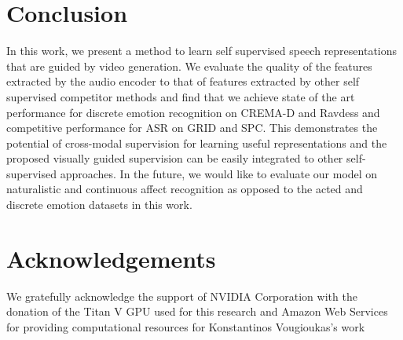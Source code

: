 \documentclass{article}
\begin{document}
\section{Conclusion}
\label{sec:conclusion}
In this work, we present a method to learn self supervised speech representations that are guided by video generation. We evaluate the quality of the features extracted by the audio encoder to that of features extracted by other self supervised competitor methods and find that we achieve state of the art performance for discrete emotion recognition on CREMA-D and Ravdess and competitive performance for ASR on GRID and SPC. This demonstrates the potential of cross-modal supervision for learning useful representations and the proposed visually guided supervision can be easily integrated to other self-supervised approaches.
In the future, we would like to evaluate our model on naturalistic and continuous affect recognition as opposed to the acted and discrete emotion datasets in this work.
 


\section{Acknowledgements}
 We gratefully acknowledge the support of NVIDIA Corporation with the donation of the Titan V GPU used for this research and Amazon Web Services for providing computational resources for Konstantinos Vougioukas's work




\end{document}
